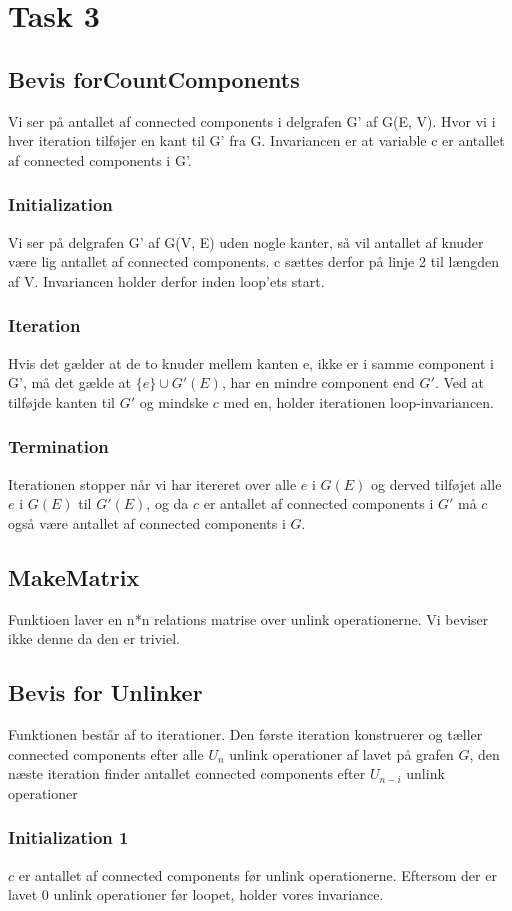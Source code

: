 \documentclass[12pt]{article}
\begin{document}
\section*{Task 3}
\subsection*{Bevis forCountComponents}
Vi ser på antallet af connected components i delgrafen G' af G(E, V). Hvor vi i hver iteration tilføjer en kant til G' fra G.
Invariancen er at variable c er antallet af connected components i G'. 
\subsubsection*{Initialization}
Vi ser på delgrafen G' af G(V, E) uden nogle kanter, så vil antallet af knuder være lig antallet af connected components. c sættes derfor på linje 2 til længden af V.
Invariancen holder derfor inden loop'ets start.
\subsubsection*{Iteration}
Hvis det gælder at de to knuder mellem kanten e, ikke er i samme component i G', må det gælde at $\{e\}\cup G'(E)$, har en mindre component end $G'$. Ved at tilføjde kanten til $G'$ og mindske $c$ med en, holder iterationen loop-invariancen.
\subsubsection*{Termination}
Iterationen stopper når vi har itereret over alle $e$ i $G(E)$ og derved tilføjet alle $e$ i $G(E)$ til $G'(E)$, og da $c$ er antallet af connected components i $G'$ må $c$ også være antallet af connected components i $G$.
\subsection*{MakeMatrix}
Funktioen laver en n*n relations matrise over unlink operationerne. Vi beviser ikke denne da den er triviel.
\subsection*{Bevis for Unlinker}
Funktionen består af to iterationer. Den første iteration konstruerer og tæller connected components efter alle $U_n$ unlink operationer af lavet på grafen $G$, den næste iteration finder antallet connected components efter $U_{n-i}$ unlink operationer
\subsubsection*{Initialization 1}
$c$ er antallet af connected components før unlink operationerne. Eftersom der er lavet $0$ unlink operationer før loopet, holder vores invariance.
\end{document}

